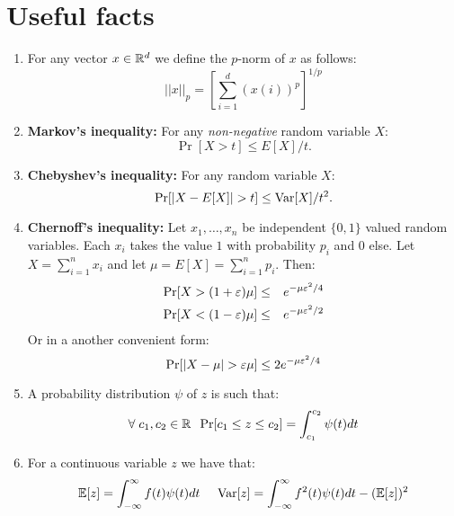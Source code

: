 \documentclass{article}
\begin{document}
\section*{Useful facts}
\begin{enumerate}
\item For any vector $x \in {\mathbb{R}}^{d}$ we define the $p$-norm of $x$ as
follows:
\[
||x||_p = [\sum_{i=1}^{d}(x(i))^p]^{1/p}
\]

\item {\bf Markov's inequality:} For any {\it non-negative} random variable
$X$:
\[
\Pr[X > t] \le E[X]/t.
\]
\item {\bf Chebyshev's inequality:} For any random variable $X$:
\[
\Pr[|X - E[X]| > t] \le {\operatorname{Var}}[X]/t^2.
\]
\item {\bf Chernoff's inequality:} Let $x_1,\ldots,x_n$ be independent
$\{0,1\}$ valued random variables. Each $x_i$ takes the value $1$
with probability $p_i$ and $0$ else. Let $X = \sum_{i=1}^{n}x_i$ and
let $\mu = E[X] = \sum_{i=1}^{n}p_i$. Then:
\begin{eqnarray*}
\Pr[X > (1+\varepsilon)\mu] &\le& e^{-\mu \varepsilon^2/4}\\
\Pr[X < (1-\varepsilon)\mu] &\le& e^{-\mu \varepsilon^2/2}
\end{eqnarray*}
Or in a another convenient form:
\[
\Pr[|X - \mu| > \varepsilon\mu] \le 2e^{-\mu \varepsilon^2/4}
\]
\item A probability distribution $\psi$ of $z$ is such that:
\[
\forall \; c_1,c_2 \in {\mathbb{R}} \;\; \Pr[c_1 \le z \le c_2]  = \int_{c_1}^{c_2}\psi(t)dt
\]

\item For a continuous variable $z$ we have that:
\[%
\E[z] = \int_{-\infty}^{\infty} f(t)\psi(t)dt \;\;\;\;\;
\Var[z] = \int_{-\infty}^{\infty} f^2(t)\psi(t)dt - (\E[z])^2
\]%

\end{enumerate}

\pagebreak


\end{document}
